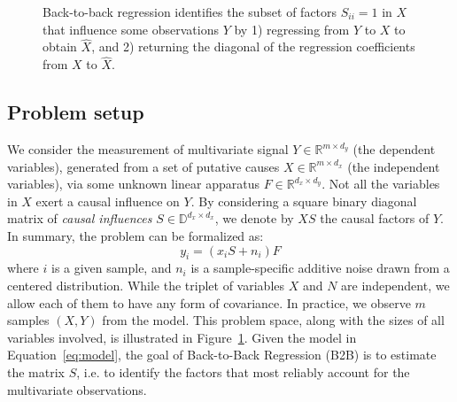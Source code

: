 \documentclass[preprint,12pt,3p]{elsarticle}
\begin{document}
\begin{figure}[t!]
  \caption{Back-to-back regression identifies the subset of factors $S_{ii} = 1$ in $X$ that influence some observations $Y$ by 1) regressing from $Y$ to $X$ to obtain $\hat{X}$, and 2) returning the diagonal of the regression coefficients from $X$ to $\hat{X}$.}
\label{fig:b2b}
\end{figure}

\subsection{Problem setup}

We consider the measurement of multivariate signal $Y \in \mathbb{R}^{m \times
d_y}$ (the dependent variables), generated from a set of putative causes $X \in \mathbb{R}^{m \times
d_x}$ (the independent variables), via some unknown linear apparatus $F \in \mathbb{R}^{d_x \times d_y}$.
%
Not all the variables in $X$ exert a causal influence on $Y$.
%
By considering a square binary diagonal matrix of \emph{causal influences} $S
\in \mathbb{D}^{d_x \times d_x}$, we denote by $XS$ the causal factors of $Y$.
%
In summary, the problem can be formalized as:
%
\begin{equation}
    y_i = (x_i S + n_i) F
    \label{eq:model}
\end{equation}
%
where $i$ is a given sample, and $n_i$ is a sample-specific additive noise drawn from a
centered distribution.
%
While the triplet of variables $X$ and $N$ are independent, we allow each of
them to have any form of covariance.
%
In practice, we observe $m$ samples $(X, Y)$ from the model.
%
This problem space, along with the sizes of all variables involved, is
illustrated in Figure~\ref{fig:b2b}.
%
Given the model in Equation~\cref{eq:model}, the goal of Back-to-Back
Regression (B2B) is to estimate the matrix $S$, i.e. to identify the factors
that most reliably account for the multivariate observations.
\end{document}
